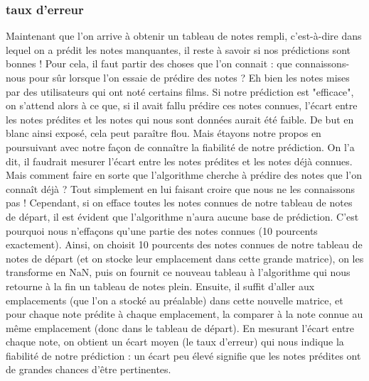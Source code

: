\documentclass[a4paper,10pt]{article}
\begin{document}
\subsubsection{taux d'erreur}
Maintenant que l'on arrive à obtenir un tableau de notes rempli, c'est-à-dire dans lequel on a prédit les notes manquantes, il reste à savoir si nos prédictions sont bonnes !
Pour cela, il faut partir des choses que l'on connait : que connaissons-nous pour sûr lorsque l'on essaie de prédire des notes ? Eh bien les notes mises par des utilisateurs qui ont noté certains films.
Si notre prédiction est "efficace", on s'attend alors à ce que, si il avait fallu prédire ces notes connues, l'écart entre les notes prédites et les notes qui nous sont données aurait été faible. De but en blanc ainsi exposé, cela peut paraître flou. Mais étayons notre propos en poursuivant avec notre façon de connaître la fiabilité de notre prédiction. On l'a dit, il faudrait mesurer l'écart entre les notes prédites et les notes déjà connues. Mais comment faire en sorte que l'algorithme cherche à prédire des notes que l'on connaît déjà ? Tout simplement en lui faisant croire que nous ne les connaissons pas ! Cependant, si on efface toutes les notes connues de notre tableau de notes de départ, il est évident que l'algorithme n'aura aucune base de prédiction. C'est pourquoi nous n'effaçons qu'une partie des notes connues (10 pourcents exactement). Ainsi, on choisit 10 pourcents des notes connues de notre tableau de notes de départ (et on stocke leur emplacement dans cette grande matrice), on les transforme en NaN, puis on fournit ce nouveau tableau à l'algorithme qui nous retourne à la fin un tableau de notes plein. Ensuite, il suffit d'aller aux emplacements (que l'on a stocké au préalable) dans cette nouvelle matrice, et pour chaque note prédite à chaque emplacement, la comparer à la note connue au même emplacement (donc dans le tableau de départ). En mesurant l'écart entre chaque note, on obtient un écart moyen (le taux d'erreur) qui nous indique la fiabilité de notre prédiction : un écart peu élevé signifie que les notes prédites ont de grandes chances d'être pertinentes.
\end{document}

